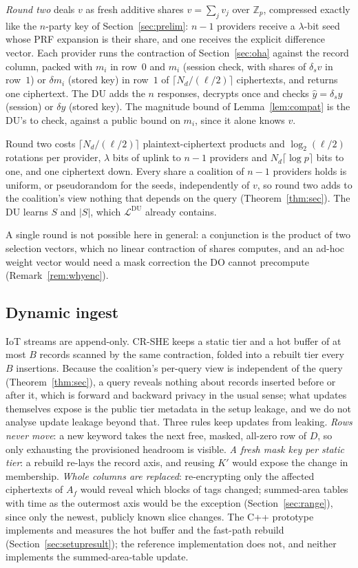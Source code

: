 \documentclass[a4paper,fleqn]{cas-sc}
\newcommand{\Leak}{\mathcal{L}}
\begin{document}
\emph{Round two} deals $v$ as fresh additive shares $v=\sum_jv_j$ over
$\mathbb{Z}_p$, compressed exactly like the $n$-party key of
Section~\ref{sec:prelim}: $n-1$ providers receive a $\lambda$-bit seed whose
PRF expansion is their share, and one receives the explicit difference vector.
Each provider runs the contraction of Section~\ref{sec:oha} against the record
column, packed with $m_i$ in row~$0$ and $m_i$ (session check, with shares of $\delta_s v$ in row~$1$) or $\delta m_i$ (stored key) in row~$1$ of
$\lceil N_d/(\ell/2)\rceil$ ciphertexts, and returns one ciphertext. The DU
adds the $n$ responses, decrypts once and checks $\hat y=\delta_s y$ (session) or $\delta y$ (stored key). The
magnitude bound of Lemma~\ref{lem:compat} is the DU's to check, against a
public bound on $m_i$, since it alone knows $v$.

Round two costs $\lceil N_d/(\ell/2)\rceil$ plaintext-ciphertext products and
$\log_2(\ell/2)$ rotations per provider, $\lambda$ bits of uplink to $n-1$
providers and $N_d\lceil\log p\rceil$ bits to one, and one ciphertext down.
Every share a coalition of $n-1$ providers holds is uniform, or pseudorandom
for the seeds, independently of $v$, so round two adds to the coalition's view
nothing that depends on the query (Theorem~\ref{thm:sec}). The DU learns $S$
and $|S|$, which $\Leak^{\text{DU}}$ already contains.

A single round is not possible here in general: a conjunction is the product
of two selection vectors, which no linear contraction of shares computes, and
an ad-hoc weight vector would need a mask correction the DO cannot precompute
(Remark~\ref{rem:whyenc}).

\subsection{Dynamic ingest}
\label{sec:ingest}
IoT streams are append-only. CR-SHE keeps a static tier and a hot buffer of at
most $B$ records scanned by the same contraction, folded into a rebuilt tier
every $B$ insertions. Because the coalition's per-query view is independent of
the query (Theorem~\ref{thm:sec}), a query reveals nothing about records
inserted before or after it, which is forward and backward privacy in the usual
sense; what updates themselves expose is the public tier metadata in the setup
leakage, and we do not analyse update leakage beyond that.
Three rules keep updates from leaking. \emph{Rows never move}: a new keyword
takes the next free, masked, all-zero row of $D$, so only exhausting the
provisioned headroom is visible. \emph{A fresh mask key per static tier}: a
rebuild re-lays the record axis, and reusing $K'$ would expose the change in
membership. \emph{Whole columns are replaced}: re-encrypting only the affected
ciphertexts of $A_f$ would reveal which blocks of tags changed; summed-area
tables with time as the outermost axis would be the exception
(Section~\ref{sec:range}), since only the newest, publicly known slice changes.
The C++ prototype implements and measures the hot buffer and the fast-path
rebuild (Section~\ref{sec:setupresult}); the reference implementation does
not, and neither implements the summed-area-table update.
\end{document}
